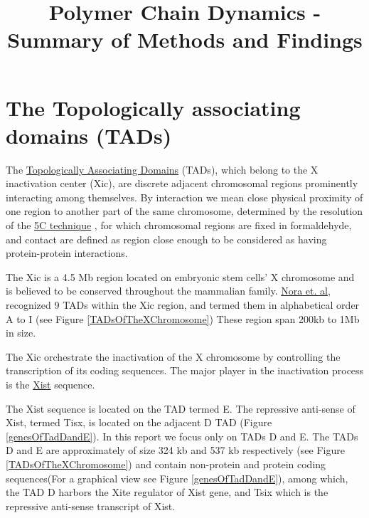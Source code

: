 \documentclass[12pt]{paper}
\begin{document}
\title{Polymer Chain Dynamics - Summary of Methods and Findings}

\maketitle
\tableofcontents


\section{The Topologically associating domains (TADs)}
The \href{http://www.nature.com/nature/journal/v485/n7398/full/nature11049.html}{Topologically Associating Domains} (TADs), which belong to the X inactivation center (Xic), are discrete adjacent chromosomal regions prominently interacting among themselves. By interaction we mean close physical proximity of one region to another part of the same chromosome, determined by the resolution of the \href{http://en.wikipedia.org/wiki/Chromosome_conformation_capture#Carbon-Copy_Chromosome_Conformation_Capture_.285C.29}{5C technique} \cite{dostie2006chromosome}\cite{de2012decade}, for which chromosomal regions are fixed in formaldehyde, and contact are defined as region close enough to be considered as having protein-protein interactions.

The Xic is a 4.5 Mb region located on embryonic stem cells' X chromosome and is believed to be conserved throughout the mammalian family.  \href{http://www.nature.com/nature/journal/v485/n7398/full/nature11049.html}{Nora et. al}\cite{nora2012spatial}, recognized 9 TADs within the Xic region, and termed them in alphabetical order A to I (see Figure \ref{TADsOfTheXChromosome}) These region span 200kb to 1Mb in size. 

The Xic orchestrate the inactivation of the X chromosome by controlling the transcription of its coding sequences. The major player in the inactivation process is the \href{http://en.wikipedia.org/wiki/XIST_(gene)#cite_note-2}{Xist} sequence.  

The Xist sequence is located on the TAD termed E. The repressive anti-sense of Xist, termed Tisx, is located on the adjacent D TAD (Figure \ref{genesOfTadDandE}). In this report we focus only on TADs D and E. The TADs D and E are approximately of size 324 kb and 537 kb respectively (see Figure \ref{TADsOfTheXChromosome}) and contain non-protein and protein coding sequences(For a graphical view see Figure \ref{genesOfTadDandE}), among which, the TAD D harbors the Xite regulator of Xist gene, and Tsix which is the repressive anti-sense transcript of Xist. 
\end{document}
